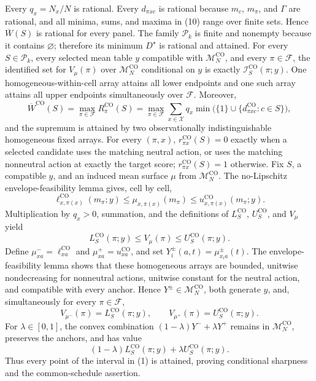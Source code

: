 Every \(q_x=N_x/N\) is rational.  Every \(d_{\pi xc}\) is rational because \(m_c\), \(m_\pi\), and \(\Gamma\) are rational, and all minima, sums, and maxima in (10) range over finite sets.  Hence \(\overline W(S)\) is rational for every panel.  The family \(\mathcal P_k\) is finite and nonempty because it contains \(\varnothing\); therefore its minimum \(D^\star\) is rational and attained.
For every \(S\in\mathcal P_k\), every selected mean table \(y\) compatible with \(\mathcal M_N^{\mathrm{CO}}\), and every \(\pi\in\mathcal F\), the identified set for \(V_\mu(\pi)\) over \(\mathcal M_N^{\mathrm{CO}}\) conditional on \(y\) is exactly \(\mathcal I^{\mathrm{CO}}_S(\pi;y)\).  One homogeneous-within-cell array attains all lower endpoints and one such array attains all upper endpoints simultaneously over \(\mathcal F\).  Moreover,
\[
\overline W^{\mathrm{CO}}(S)
=\max_{\pi\in\mathcal F}R^{\mathrm{CO}}_\pi(S)
=\max_{\pi\in\mathcal F}\sum_{x\in\mathcal X}q_x
\min\bigl(\{1\}\cup\{d^{\mathrm{CO}}_{\pi xc}:c\in S\}\bigr),
\]
and the supremum is attained by two observationally indistinguishable homogeneous fixed arrays.  For every \((\pi,x)\), \(r^{\mathrm{CO}}_{\pi x}(S)=0\) exactly when a selected candidate uses the matching neutral action, or uses the matching nonneutral action at exactly the target score; \(r^{\mathrm{CO}}_{\pi x}(S)=1\) otherwise.
Fix \(S\), a compatible \(y\), and an induced mean surface \(\mu\) from \(\mathcal M_N^{\mathrm{CO}}\).  The no-Lipschitz envelope-feasibility lemma gives, cell by cell,
\[
\ell^{\mathrm{CO}}_{x,\pi(x)}(m_\pi;y)
\leq\mu_{x,\pi(x)}(m_\pi)
\leq u^{\mathrm{CO}}_{x,\pi(x)}(m_\pi;y).
\]
Multiplication by \(q_x>0\), summation, and the definitions of \(L^{\mathrm{CO}}_S\), \(U^{\mathrm{CO}}_S\), and \(V_\mu\) yield
\[
L^{\mathrm{CO}}_S(\pi;y)
\leq V_\mu(\pi)
\leq U^{\mathrm{CO}}_S(\pi;y).
\tag{1}
\]
Define \(\mu^-_{xa}=\ell^{\mathrm{CO}}_{xa}\) and \(\mu^+_{xa}=u^{\mathrm{CO}}_{xa}\), and set \(Y_i^\pm(a,t)=\mu^\pm_{x_i a}(t)\).  The envelope-feasibility lemma shows that these homogeneous arrays are bounded, unitwise nondecreasing for nonneutral actions, unitwise constant for the neutral action, and compatible with every anchor.  Hence \(Y^\pm\in\mathcal M_N^{\mathrm{CO}}\), both generate \(y\), and, simultaneously for every \(\pi\in\mathcal F\),
\[
V_{\mu^-}(\pi)=L^{\mathrm{CO}}_S(\pi;y),
\qquad
V_{\mu^+}(\pi)=U^{\mathrm{CO}}_S(\pi;y).
\tag{2}
\]
For \(\lambda\in[0,1]\), the convex combination \((1-\lambda)Y^-+\lambda Y^+\) remains in \(\mathcal M_N^{\mathrm{CO}}\), preserves the anchors, and has value
\[
(1-\lambda)L^{\mathrm{CO}}_S(\pi;y)
+\lambda U^{\mathrm{CO}}_S(\pi;y).
\]
Thus every point of the interval in (1) is attained, proving conditional sharpness and the common-schedule assertion.

